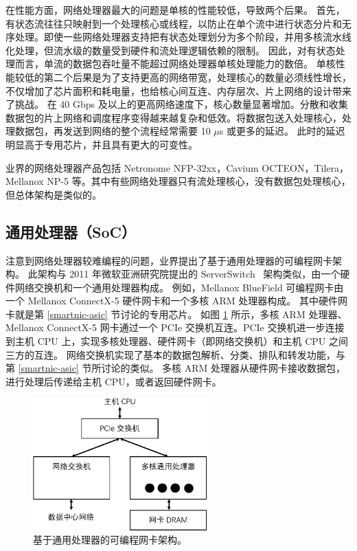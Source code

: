 在性能方面，网络处理器最大的问题是单核的性能较低，导致两个后果。
首先，有状态流往往只映射到一个处理核心或线程，以防止在单个流中进行状态分片和无序处理。即使一些网络处理器支持把有状态处理划分为多个阶段，并用多核流水线化处理，但流水级的数量受到硬件和流处理逻辑依赖的限制。
因此，对有状态处理而言，单流的数据包吞吐量不能超过网络处理器单核处理能力的数倍。
单核性能较低的第二个后果是为了支持更高的网络带宽，处理核心的数量必须线性增长，不仅增加了芯片面积和耗电量，也给核心间互连、内存层次、片上网络的设计带来了挑战。
在 40 Gbps 及以上的更高网络速度下，核心数量显著增加。分散和收集数据包的片上网络和调度程序变得越来越复杂和低效。将数据包送入处理核心，处理数据包，再发送到网络的整个流程经常需要 10 $\mu$s 或更多的延迟。
此时的延迟明显高于专用芯片，并且具有更大的可变性。


业界的网络处理器产品包括 Netronome NFP-32xx，Cavium OCTEON，Tilera，Mellanox NP-5 等。其中有些网络处理器只有流处理核心，没有数据包处理核心，但总体架构是类似的。




\subsection{通用处理器（SoC）}
\label{smartnic-soc}

注意到网络处理器较难编程的问题，业界提出了基于通用处理器的可编程网卡架构。
此架构与 2011 年微软亚洲研究院提出的 ServerSwitch~\cite{lu2011serverswitch} 架构类似，由一个硬件网络交换机和一个通用处理器构成。
例如，Mellanox BlueField \cite{mellanox-bluefield} 可编程网卡由一个 Mellanox ConnectX-5 硬件网卡和一个多核 ARM 处理器构成。
其中硬件网卡就是第 \ref{smartnic-asic} 节讨论的专用芯片。
如图 \ref{background:fig:smartnic_soc} 所示，多核 ARM 处理器、Mellanox ConnectX-5 网卡通过一个 PCIe 交换机互连。PCIe 交换机进一步连接到主机 CPU 上，实现多核处理器、硬件网卡（即网络交换机）和主机 CPU 之间三方的互连。
网络交换机实现了基本的数据包解析、分类、排队和转发功能，与第 \ref{smartnic-asic} 节所讨论的类似。
多核 ARM 处理器从硬件网卡接收数据包，进行处理后传递给主机 CPU，或者返回硬件网卡。


\begin{figure}[htbp]
	\centering
	\includegraphics[width=0.6\textwidth]{figures/smartnic_soc.pdf}
	\caption{基于通用处理器的可编程网卡架构。}
	\label{background:fig:smartnic_soc}
\end{figure}

